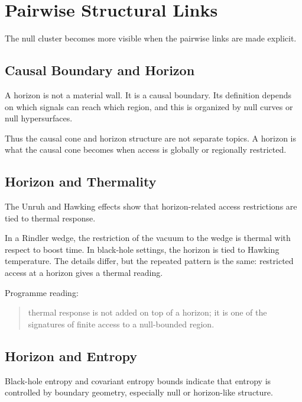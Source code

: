 \documentclass[12pt,a4paper]{article}
\theoremstyle{definition}
\theoremstyle{remark}
\begin{document}
\section{Pairwise Structural Links}\label{pairwise-structural-links}

The null cluster becomes more visible when the pairwise links are made
explicit.

\subsection{Causal Boundary and
Horizon}\label{causal-boundary-and-horizon}

A horizon is not a material wall. It is a causal boundary. Its
definition depends on which signals can reach which region, and this is
organized by null curves or null hypersurfaces.

Thus the causal cone and horizon structure are not separate topics. A
horizon is what the causal cone becomes when access is globally or
regionally restricted.

\subsection{Horizon and Thermality}\label{horizon-and-thermality}

The Unruh and Hawking effects show that horizon-related access
restrictions are tied to thermal response.

In a Rindler wedge, the restriction of the vacuum to the wedge is
thermal with respect to boost time. In black-hole settings, the horizon
is tied to Hawking temperature. The details differ, but the repeated
pattern is the same: restricted access at a horizon gives a thermal
reading.

Programme reading:

\begin{quote}
thermal response is not added on top of a horizon; it is one of the
signatures of finite access to a null-bounded region.
\end{quote}

\subsection{Horizon and Entropy}\label{horizon-and-entropy}

Black-hole entropy and covariant entropy bounds indicate that entropy is
controlled by boundary geometry, especially null or horizon-like
structure.
\end{document}
